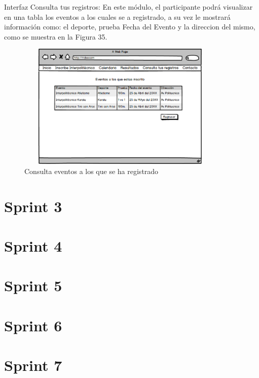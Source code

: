 	\noindent Interfaz Consulta tus registros: En este módulo, el participante podrá visualizar en una tabla los eventos a los cuales se a registrado, a su vez le mostrará información como: el deporte, prueba Fecha del Evento y la direccion del mismo, como se muestra en la Figura 35.
	\begin{figure}[hbt!]
		\centering
		\includegraphics[width=10cm, height=6cm]{Imagenes/Disenos/p18ConsultaInscripciones.png}
		\caption{Consulta eventos a los que se ha registrado}
	\end{figure}
	\section{Sprint 3}
	
	\section{Sprint 4}
	
	\section{Sprint 5}
	
	\section{Sprint 6}
	
	\section{Sprint 7}
